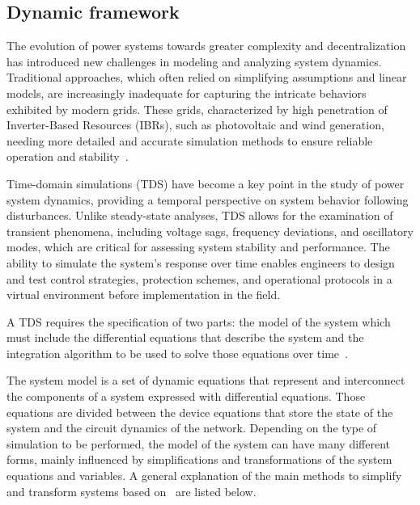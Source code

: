 
\subsection{Dynamic framework}

The evolution of power systems towards greater complexity and decentralization has introduced new challenges in modeling and analyzing system dynamics. 
Traditional approaches, which often relied on simplifying assumptions and linear models, are increasingly inadequate for capturing the intricate behaviors 
exhibited by modern grids. These grids, characterized by high penetration of Inverter-Based Resources (IBRs), such as photovoltaic and wind generation,
needing more detailed and accurate simulation methods to ensure reliable operation and stability~\cite{LaraTDS}.

Time-domain simulations (TDS) have become a key point in the study of power system dynamics, providing a temporal perspective on system behavior following disturbances.
Unlike steady-state analyses, TDS allows for the examination of transient phenomena, including voltage sags, frequency deviations, and oscillatory modes, 
which are critical for assessing system stability and performance. The ability to simulate the system's response over time enables engineers to design and test control strategies,
protection schemes, and operational protocols in a virtual environment before implementation in the field.

A TDS requires the specification of two parts: the model of the system which must include the differential equations that describe the system and the
integration algorithm to be used to solve those equations over time~\cite{LaraTDS}. 

The system model is a set of dynamic equations that represent and interconnect the components of a system expressed with differential equations. Those
equations are divided between the device equations that store the state of the system and the circuit dynamics of the network. Depending on the type of
simulation to be performed, the model of the system can have many different forms, mainly influenced by simplifications and transformations of the system equations and 
variables. A general explanation of the main methods to simplify and transform systems based on~\cite{LaraTDS} are listed below.

